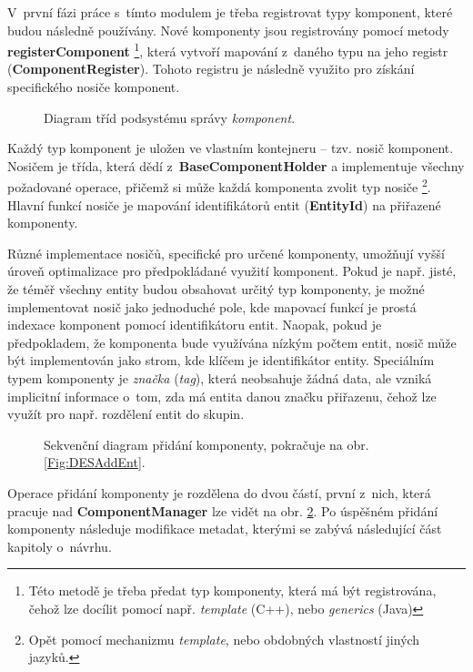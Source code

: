 V~první fázi práce s~tímto modulem je třeba registrovat typy komponent, které budou následně používány. Nové komponenty jsou registrovány pomocí metody \textbf{registerComponent} \footnote{Této metodě je třeba předat typ komponenty, která má být registrována, čehož lze docílit pomocí např. \emph{template} (C++), nebo \emph{generics} (Java)}, která vytvoří mapování z~daného typu na jeho registr (\textbf{ComponentRegister}). Tohoto registru je následně využito pro získání specifického nosiče komponent.

\begin{figure}[H]
	\caption{Diagram tříd podsystému správy \emph{komponent}.}
	\label{Fig:DESCompDiag}
\end{figure}

Každý typ komponent je uložen ve vlastním kontejneru -- tzv. nosič komponent. Nosičem je třída, která dědí z~\textbf{BaseComponentHolder} a implementuje všechny požadované operace, přičemž si může každá komponenta zvolit typ nosiče \footnote{Opět pomocí mechanizmu \emph{template}, nebo obdobných vlastností jiných jazyků.}. Hlavní funkcí nosiče je mapování identifikátorů entit (\textbf{EntityId}) na přiřazené komponenty. 

Různé implementace nosičů, specifické pro určené komponenty, umožňují vyšší úroveň optimalizace pro předpokládané využití komponent. Pokud je např. jisté, že téměř všechny entity budou obsahovat určitý typ komponenty, je možné implementovat nosič jako jednoduché pole, kde mapovací funkcí je prostá indexace komponent pomocí identifikátoru entit. Naopak, pokud je předpokladem, že komponenta bude využívána nízkým počtem entit, nosič může být implementován jako strom, kde klíčem je identifikátor entity. Speciálním typem komponenty je \emph{značka} (\emph{tag}), která neobsahuje žádná data, ale vzniká implicitní informace o~tom, zda má entita danou značku přiřazenu, čehož lze využít pro např. rozdělení entit do skupin.

\begin{figure}[H]
	\caption{Sekvenční diagram přidání komponenty, pokračuje na obr. \ref{Fig:DESAddEnt}.}
	\label{Fig:DESAddComp}
\end{figure}

Operace přidání komponenty je rozdělena do dvou částí, první z~nich, která pracuje nad \textbf{ComponentManager} lze vidět na obr. \ref{Fig:DESAddComp}. Po úspěšném přidání komponenty následuje modifikace metadat, kterými se zabývá následující část kapitoly o~návrhu.

